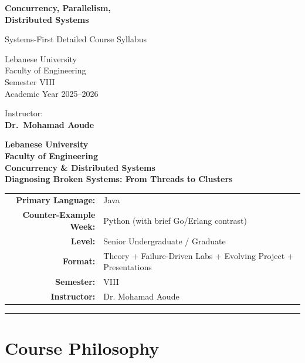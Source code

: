\documentclass[11pt,a4paper]{article}
\newcommand{\courseTitle}{Concurrency \& Distributed Systems}
\newcommand{\courseSubtitle}{Diagnosing Broken Systems: From Threads to Clusters}
\newcommand{\primaryLang}{Java}
\newcommand{\counterWeek}{Python (with brief Go/Erlang contrast)}
\newcommand{\level}{Senior Undergraduate / Graduate}
\newcommand{\format}{Theory + Failure-Driven Labs + Evolving Project + Presentations}
\newcommand{\instructor}{Dr. Mohamad Aoude}
\begin{document}
\begin{titlepage}
	\centering
	\vspace*{3cm}
	
	{\Huge\bfseries\color{primary}
		Concurrency, Parallelism,\\
		Distributed Systems}
	
	\vspace{1cm}
	{\Large Systems-First Detailed Course Syllabus}
	
	\vspace{2cm}
	{\large
		Lebanese University\\
		Faculty of Engineering\\
		Semester VIII\\
		Academic Year 2025--2026
	}
	
	\vfill
	{\large
		Instructor:\\
		\textbf{Dr.\ Mohamad Aoude}
	}
	
	\vspace{1cm}
\end{titlepage}	
	\begin{center}
		{\Large \textbf{Lebanese University}}\\[1mm]
		{\large \textbf{Faculty of Engineering}}\\[4mm]
		
		{\LARGE \textbf{\courseTitle}}\\[1mm]
		{\large \textbf{\courseSubtitle}}\\[4mm]
		
		\begin{tabular}{>{\bfseries}rl}
			Primary Language: & \primaryLang \\
			Counter-Example Week: & \counterWeek \\
			Level: & \level \\
			Format: & \format \\
			Semester: & VIII \\
			Instructor: & \instructor \\
		\end{tabular}
	\end{center}
	
	\vspace{4mm}
	\hrule
	\vspace{6mm}
	
	\section*{Course Philosophy}
	
\end{document}
